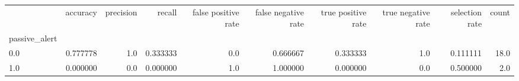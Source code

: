 \begin{tabular}{lrrrrrrrrr}
\toprule
{} &  accuracy &  precision &    recall &  false positive rate &  false negative rate &  true positive rate &  true negative rate &  selection rate &  count \\
passive\_alert &           &            &           &                      &                      &                     &                     &                 &        \\
\midrule
0.0           &  0.777778 &        1.0 &  0.333333 &                  0.0 &             0.666667 &            0.333333 &                 1.0 &        0.111111 &   18.0 \\
1.0           &  0.000000 &        0.0 &  0.000000 &                  1.0 &             1.000000 &            0.000000 &                 0.0 &        0.500000 &    2.0 \\
\bottomrule
\end{tabular}
